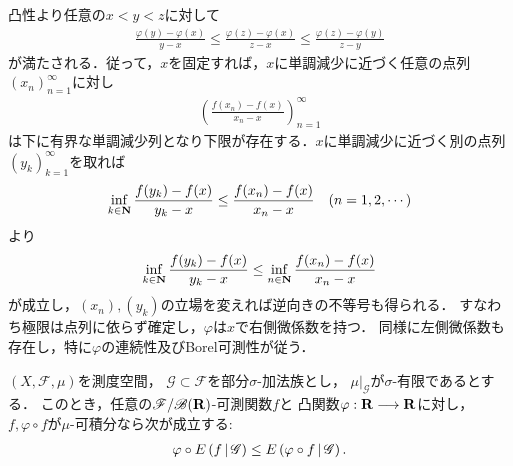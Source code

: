 	\begin{prf}
		凸性より任意の$x < y < z$に対して
		\begin{align}
			\frac{\varphi(y) - \varphi(x)}{y - x} 
			\leq \frac{\varphi(z) - \varphi(x)}{z - x}
			\leq \frac{\varphi(z) - \varphi(y)}{z - y}
			\label{ineq:lem:convex_function_measurability_1}
		\end{align}
		が満たされる．従って，$x$を固定すれば，$x$に単調減少に近づく任意の点列$(x_n)_{n=1}^{\infty}$に対し
		 \begin{align}
		 	\left(\frac{f(x_n)-f(x)}{x_n-x}\right)_{n=1}^{\infty} 
		 	\label{seq:lem:convex_function_measurability_2}
		 \end{align}
		 は下に有界な単調減少列となり下限が存在する．$x$に単調減少に近づく別の点列$(y_k)_{k=1}^{\infty}$を取れば
		 \begin{align}
		 	\operatorname*{inf}_{k \in \mathbf{N}} \frac{f(y_k)-f(x)}{y_k-x} \leq \frac{f(x_n)-f(x)}{x_n-x} \quad (n=1,2,\cdots)
		 \end{align}
		 より
		 \begin{align}
		 	\operatorname*{inf}_{k \in \mathbf{N}} \frac{f(y_k)-f(x)}{y_k-x} \leq \operatorname*{inf}_{n \in \mathbf{N}} \frac{f(x_n)-f(x)}{x_n-x}
		 \end{align}
		 が成立し，$(x_n),(y_k)$の立場を変えれば逆向きの不等号も得られる．
		 すなわち極限は点列に依らず確定し，$\varphi$は$x$で右側微係数を持つ．
		 同様に左側微係数も存在し，特に$\varphi$の連続性及びBorel可測性が従う．
		 \QED
	\end{prf}
	
	\begin{screen}
		\begin{thm}[Jensenの不等式]\label{thm:Jensen_inequality_for_convex_functions}
			$(X,\mathscr{F},\mu)$を測度空間，
			$\mathscr{G} \subset \mathscr{F}$を部分$\sigma$-加法族とし，
			$\left. \mu \right|_{\mathscr{G}}$が$\sigma$-有限であるとする．
			このとき，任意の$\mathscr{F}/\mathscr{B}(\mathbf{R})$-可測関数$f$と
			凸関数$\varphi:\mathbf{R} \longrightarrow \mathbf{R}$に対し，
			$f,\varphi \circ f$が$\mu$-可積分なら次が成立する:
			\begin{align}
				\varphi \circ E\left( f \, \middle|\, \mathscr{G} \right)
				\leq E\left( \varphi \circ f \, \middle|\, \mathscr{G} \right).
			\end{align}
		\end{thm}
	\end{screen}
	
